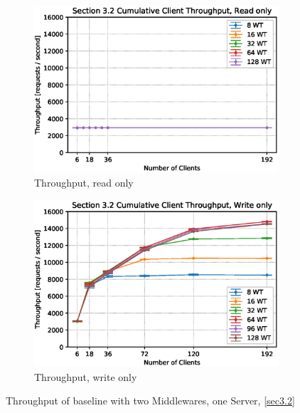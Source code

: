 \documentclass[11pt,a4paper]{article}
\begin{document}
\begin{figure}
    \begin{subfigure}{.5\textwidth}
        \includegraphics[width=1\linewidth]{plots/3_2a_throughputMiddleware.eps}
        \caption{Throughput, read only}
    \end{subfigure}
    \begin{subfigure}{.5\textwidth}
        \includegraphics[width=1\linewidth]{plots/3_2b_throughputMiddleware.eps}
        \caption{Throughput, write only}
    \end{subfigure}

    \caption{Throughput of baseline with two Middlewares, one Server, \autoref{sec3.2}}
    \label{fig:3-2-throughput}
\end{figure}
\end{document}
